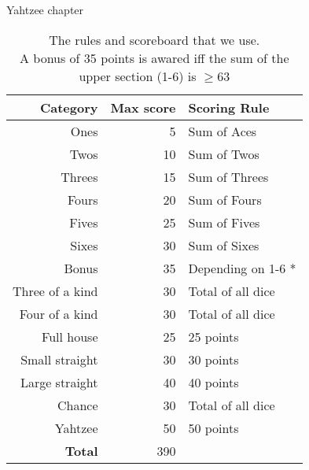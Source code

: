 Yahtzee chapter


\begin{table}
\centering
\begin{tabular}{|r|r|l|}
\hline
\textbf{Category} & \textbf{Max score} & \textbf{Scoring Rule} \\ \hline
Ones				&  5 & Sum of Aces 			\\ \hline
Twos				& 10 & Sum of Twos 			\\ \hline
Threes				& 15 & Sum of Threes 		\\ \hline
Fours				& 20 & Sum of Fours 		\\ \hline
Fives				& 25 & Sum of Fives 		\\ \hline
Sixes				& 30 & Sum of Sixes 		\\ \Xhline{3\arrayrulewidth}
Bonus				& 35 & Depending on 1-6 *	\\ \Xhline{3\arrayrulewidth}
Three of a kind		& 30 & Total of all dice 	\\ \hline
Four of a kind		& 30 & Total of all dice 	\\ \hline
Full house			& 25 & 25 points 			\\ \hline
Small straight		& 30 & 30 points 			\\ \hline
Large straight		& 40 & 40 points 			\\ \hline	
Chance				& 30 & Total of all dice 	\\ \hline	
Yahtzee				& 50 & 50 points 			\\ \Xhline{5\arrayrulewidth}	
\textbf{Total}		& 390 &						\\ \hline
\end{tabular}
\caption{The rules and scoreboard that we use. \\
\textasteriskcentered A bonus of 35 points is awared iff the sum of the upper section (1-6) is $\ge 63$}
	\label{tab:rollout_cap_results}
\end{table}

